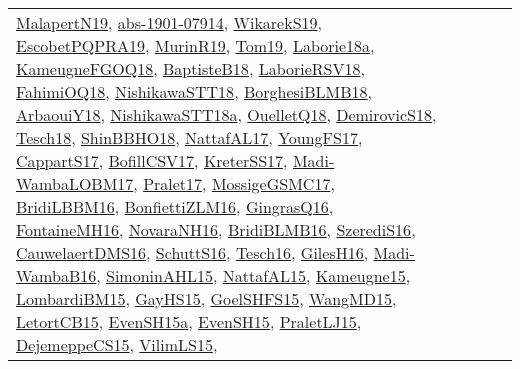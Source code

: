 {\begin{longtable}{lp{3cm}>{\raggedright}p{6cm}>{\raggedright}p{6cm}p{8cm}}
\href{papers/MalapertN19.pdf}{MalapertN19}\cite{MalapertN19}, \href{articles/abs-1901-07914.pdf}{abs-1901-07914}\cite{abs-1901-07914}, \href{articles/WikarekS19.pdf}{WikarekS19}\cite{WikarekS19}, \href{articles/EscobetPQPRA19.pdf}{EscobetPQPRA19}\cite{EscobetPQPRA19}, \href{papers/MurinR19.pdf}{MurinR19}\cite{MurinR19}, \href{papers/Tom19.pdf}{Tom19}\cite{Tom19}, \href{papers/Laborie18a.pdf}{Laborie18a}\cite{Laborie18a}, \href{papers/KameugneFGOQ18.pdf}{KameugneFGOQ18}\cite{KameugneFGOQ18}, \href{articles/BaptisteB18.pdf}{BaptisteB18}\cite{BaptisteB18}, \href{articles/LaborieRSV18.pdf}{LaborieRSV18}\cite{LaborieRSV18}, \href{articles/FahimiOQ18.pdf}{FahimiOQ18}\cite{FahimiOQ18}, \href{papers/NishikawaSTT18.pdf}{NishikawaSTT18}\cite{NishikawaSTT18}, \href{articles/BorghesiBLMB18.pdf}{BorghesiBLMB18}\cite{BorghesiBLMB18}, \href{papers/ArbaouiY18.pdf}{ArbaouiY18}\cite{ArbaouiY18}, \href{papers/NishikawaSTT18a.pdf}{NishikawaSTT18a}\cite{NishikawaSTT18a}, \href{papers/OuelletQ18.pdf}{OuelletQ18}\cite{OuelletQ18}, \href{papers/DemirovicS18.pdf}{DemirovicS18}\cite{DemirovicS18}, \href{papers/Tesch18.pdf}{Tesch18}\cite{Tesch18}, \href{articles/ShinBBHO18.pdf}{ShinBBHO18}\cite{ShinBBHO18}, \href{articles/NattafAL17.pdf}{NattafAL17}\cite{NattafAL17}, \href{papers/YoungFS17.pdf}{YoungFS17}\cite{YoungFS17}, \href{papers/CappartS17.pdf}{CappartS17}\cite{CappartS17}, \href{papers/BofillCSV17.pdf}{BofillCSV17}\cite{BofillCSV17}, \href{articles/KreterSS17.pdf}{KreterSS17}\cite{KreterSS17}, \href{papers/Madi-WambaLOBM17.pdf}{Madi-WambaLOBM17}\cite{Madi-WambaLOBM17}, \href{papers/Pralet17.pdf}{Pralet17}\cite{Pralet17}, \href{papers/MossigeGSMC17.pdf}{MossigeGSMC17}\cite{MossigeGSMC17}, \href{papers/BridiLBBM16.pdf}{BridiLBBM16}\cite{BridiLBBM16}, \href{papers/BonfiettiZLM16.pdf}{BonfiettiZLM16}\cite{BonfiettiZLM16}, \href{papers/GingrasQ16.pdf}{GingrasQ16}\cite{GingrasQ16}, \href{papers/FontaineMH16.pdf}{FontaineMH16}\cite{FontaineMH16}, \href{articles/NovaraNH16.pdf}{NovaraNH16}\cite{NovaraNH16}, \href{articles/BridiBLMB16.pdf}{BridiBLMB16}\cite{BridiBLMB16}, \href{papers/SzerediS16.pdf}{SzerediS16}\cite{SzerediS16}, \href{papers/CauwelaertDMS16.pdf}{CauwelaertDMS16}\cite{CauwelaertDMS16}, \href{papers/SchuttS16.pdf}{SchuttS16}\cite{SchuttS16}, \href{papers/Tesch16.pdf}{Tesch16}\cite{Tesch16}, \href{papers/GilesH16.pdf}{GilesH16}\cite{GilesH16}, \href{papers/Madi-WambaB16.pdf}{Madi-WambaB16}\cite{Madi-WambaB16}, \href{articles/SimoninAHL15.pdf}{SimoninAHL15}\cite{SimoninAHL15}, \href{articles/NattafAL15.pdf}{NattafAL15}\cite{NattafAL15}, \href{articles/Kameugne15.pdf}{Kameugne15}\cite{Kameugne15}, \href{papers/LombardiBM15.pdf}{LombardiBM15}\cite{LombardiBM15}, \href{papers/GayHS15.pdf}{GayHS15}\cite{GayHS15}, \href{articles/GoelSHFS15.pdf}{GoelSHFS15}\cite{GoelSHFS15}, \href{articles/WangMD15.pdf}{WangMD15}\cite{WangMD15}, \href{articles/LetortCB15.pdf}{LetortCB15}\cite{LetortCB15}, \href{articles/EvenSH15a.pdf}{EvenSH15a}\cite{EvenSH15a}, \href{papers/EvenSH15.pdf}{EvenSH15}\cite{EvenSH15}, \href{papers/PraletLJ15.pdf}{PraletLJ15}\cite{PraletLJ15}, \href{papers/DejemeppeCS15.pdf}{DejemeppeCS15}\cite{DejemeppeCS15}, \href{papers/VilimLS15.pdf}{VilimLS15}\cite{VilimLS15}, 
\end{longtable}}
